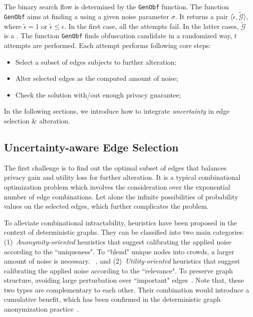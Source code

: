 The binary search flow is determined by the \texttt{GenObf} function. 
The function \texttt{GenObf} aims at finding a {\keobf} using a given noise parameter $\sigma$.
It returns a pair $\langle \tilde{\epsilon}, \tilde{\mathcal{G}} \rangle$, where $\tilde{\epsilon} =1$ or $\tilde{\epsilon} \le \epsilon$. In the first case, all the attempts fail. In the latter cases, $\tilde{\mathcal{G}}$ is a {\keobf}. 
The function \texttt{GenObf} finds obfuscation candidate in a randomized way, $t$ attempts are performed. Each attempt performs following core steps:
\begin{itemize}
    \item{Select a subset of edges subjects to further alteration;}
    \item{Alter selected edges as the computed amount of noise;}
    \item{Check the solution with/out enough privacy guarantee;}
\end{itemize}
In the following sections, we introduce how to integrate \emph{uncertainty} in edge selection \& alteration. 


\subsection{Uncertainty-aware Edge Selection}
The first challenge is to find out the optimal subset of edges that balances privacy gain and utility loss for further alteration. 
It is a typical combinational optimization problem which involves the consideration over the exponential number of edge combinations. Let alone the infinite possibilities of probability values on the selected edges, which further complicates the problem.

To alleviate combinational intractability, heuristics have been proposed in the context of deterministic graphs. 
They can be classified into two main categories: 
(1)~{\em Anonymity-oriented} heuristics that suggest calibrating the applied noise according to the ``uniqueness". To ``blend" unique nodes into crowds, a larger amount of noise is necessary. ~\cite{Boldi_Injecting_2012,Liu_Towards_2008, Thompson_The_2009,Zhou_Preserving_2008}, and 
(2)~{\em Utility-oriented} heuristics that suggest calibrating the applied noise according to the ``relevance". To preserve graph structure, avoiding large perturbation over ``important" edges~\cite{casasprivacy,Ying_Randomizing_2008,Liu_Privacy_2009,Ninggal_Utility_2015}.
Note that, these two types are complementary to each other. Their combination would introduce a cumulative benefit, which has been confirmed in the deterministic graph anonymization practice~\cite{casasprivacy}. 

